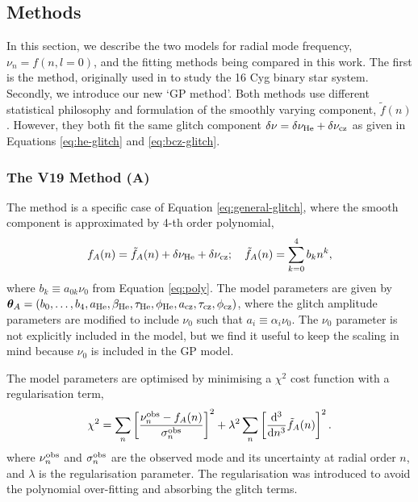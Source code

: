 \subsection{Methods}\label{sec:glitch-methods}

In this section, we describe the two models for radial mode frequency, \(\nu_n = f(n, l=0)\), and the fitting methods being compared in this work. The first is the  method, originally used in \citet{Verma.Faria.ea2014} to study the 16 Cyg binary star system. Secondly, we introduce our new `GP method'. Both methods use different statistical philosophy and formulation of the smoothly varying component, \(\tilde{f}(n)\). However, they both fit the same glitch component \(\delta\nu = \delta\nu_{{\mathrm{He}}} + \delta\nu_{{\mathrm{cz}}}\) as given in Equations \ref{eq:he-glitch} and \ref{eq:bcz-glitch}.

\subsubsection{The V19 Method (A)}

The  method is a specific case of Equation \ref{eq:general-glitch}, where the smooth component is approximated by 4-th order polynomial,
%
\begin{equation}
    f_A(n) = \tilde{f}_A(n) + \delta\nu_{{\mathrm{He}}} + \delta\nu_{{\mathrm{cz}}}; \quad \tilde{f}_A(n) = \sum_{k=0}^{4} b_k n^k,
\end{equation}
%
\sloppy where \(b_k \equiv a_{0k} \nu_0\) from Equation \ref{eq:poly}. The model parameters are given by \(\bm{\theta}_A = (b_0, \dots, b_4, a_{{\mathrm{He}}}, \beta_{{\mathrm{He}}}, \tau_{{\mathrm{He}}}, \phi_{{\mathrm{He}}}, a_{{\mathrm{cz}}}, \tau_{{\mathrm{cz}}}, \phi_{{\mathrm{cz}}})\), where the glitch amplitude parameters are modified to include \(\nu_0\) such that \(a_i \equiv \alpha_i\nu_0\). The \(\nu_0\) parameter is not explicitly included in the  model, but we find it useful to keep the scaling in mind because \(\nu_0\) is included in the GP model. 

The model parameters are optimised by minimising a \(\chi^2\) cost function with a regularisation term,
%
\begin{equation}
    \chi^2 = \sum_n \left[ \frac{\nu_n^{{\mathrm{obs}}} - f_{A}(n)}{\sigma_n^{{\mathrm{obs}}}} \right]^2 + \lambda^2 \sum_n \left[ \frac{\mathrm{d}^3}{\mathrm{d} n^3} \tilde{f}_A(n)\right]^2.
\end{equation}
%
where \(\nu_n^{{\mathrm{obs}}}\) and \(\sigma_n^{{\mathrm{obs}}}\) are the observed mode and its uncertainty at radial order \(n\), and \(\lambda\) is the regularisation parameter. The regularisation was introduced to avoid the polynomial over-fitting and absorbing the glitch terms.

